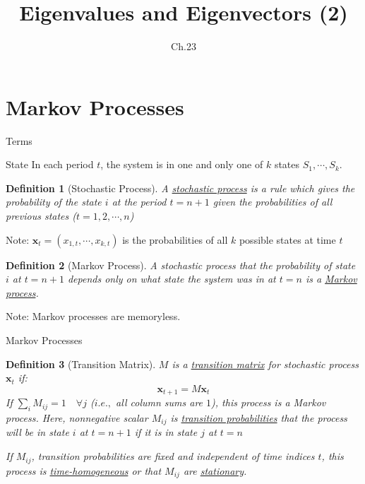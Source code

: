 \documentclass[a4paper,11pt]{article}
\author[조남운]{\mail}
\title{Eigenvalues and Eigenvectors (2)}
\subtitle{Ch.23}
\newtheorem{defn}{Definition}
\newcommand{\bd}{\mathbf}
\begin{document}
	
\maketitle


\setcounter{section}{5}

\section{Markov Processes} %
\label{sec:markov_process}
\begin{frame}[t]{Terms}
	\begin{block}
		{State} In each period $t$, the system is in one and only one of $k$ states $S_1,\cdots,S_k$. 
	\end{block}
	\begin{defn}
		[Stochastic Process]
		A \uline{stochastic process} is a rule which gives the probability of the state $i$ at the period $t=n+1$ given the probabilities of all previous states ($t=1,2,\cdots,n$)
	\end{defn}
	Note: $\bd{x}_t=(x_{1,t},\cdots,x_{k,t})$ is the probabilities of all $k$ possible states at time $t$
	\begin{defn}
		[Markov Process] A stochastic process that the probability of state $i$ at $t=n+1$ depends only on what state the system was in at $t=n$ is a \uline{Markov process}. 
	\end{defn}
	Note: Markov processes are memoryless. 
\end{frame}

\begin{frame}[t]{Markov Processes}
	\begin{defn}
		[Transition Matrix] $M$ is a \uline{transition matrix} for stochastic process $\bd{x}_t$ if: \[
			\bd{x}_{t+1} = M \bd{x}_t
		\]
		If $\sum_{i} M_{ij} = 1 \quad \forall j$ ($i.e.,$ all column sums are $1$), this process is a Markov process. Here, nonnegative scalar $M_{ij}$ is \uline{transition probabilities} that the process will be in state $i$ at $t=n+1$ if it is in state $j$ at $t=n$
		
		If $M_{ij}$, transition probabilities are fixed and independent of time indices $t$, this process is \uline{time-homogeneous} or that $M_{ij}$ are \uline{stationary}.
	\end{defn}
\end{frame}
\end{document}
